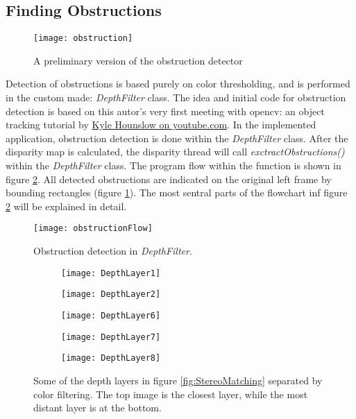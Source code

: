 \subsection{Finding Obstructions}

\begin{figure}
	\texttt{[image: obstruction]}
	\caption{A preliminary version of the obstruction detector}
	\label{fig:obstruction}
\end{figure}

Detection of obstructions is based purely on color thresholding, and is performed in the custom made: \textit{DepthFilter} class. The idea and initial code for obstruction detection is based on this autor's very first meeting with \gls{opencv}: an object tracking tutorial by \href{https://www.youtube.com/watch?v=bSeFrPrqZ2A}{Kyle Hounslow on youtube.com}. In the implemented application, obstruction detection is done within the \textit{DepthFilter} class. After the disparity map is calculated, the disparity thread will call \textit{exctractObstructions()} within the \textit{DepthFilter} class. The program flow within the function is shown in figure \ref{fig:obstructionFlow}. All detected obstructions are indicated on the original left frame by bounding rectangles (figure \ref{fig:obstruction}). The most sentral parts of the flowchart inf figure \ref{fig:obstructionFlow} will be explained in detail.

\begin{figure}
	\centering
	\texttt{[image: obstructionFlow]}
	\caption{Obstruction detection in \textit{DepthFilter}.}
	\label{fig:obstructionFlow}
\end{figure}

\begin{wrapfigure}{l}{0.4\textwidth}
	\centering
	
	\begin{subfigure}[b]{0.35\textwidth}
		\texttt{[image: DepthLayer1]}
	\end{subfigure}
	\par\medskip
	\begin{subfigure}[b]{0.35\textwidth}
		\texttt{[image: DepthLayer2]}
	\end{subfigure}
	\par\medskip
	\begin{subfigure}[b]{0.35\textwidth}
		\texttt{[image: DepthLayer6]}
	\end{subfigure}
	\par\medskip
	\begin{subfigure}[b]{0.35\textwidth}
		\texttt{[image: DepthLayer7]}
	\end{subfigure}
	\par\medskip
	\begin{subfigure}[b]{0.35\textwidth}
		\texttt{[image: DepthLayer8]}
	\end{subfigure}
	
	\caption{Some of the depth layers in figure \ref{fig:StereoMatching} separated by color filtering. The top image is the closest layer, while the most distant layer is at the bottom.}
	\label{fig:layers2}
\end{wrapfigure}


